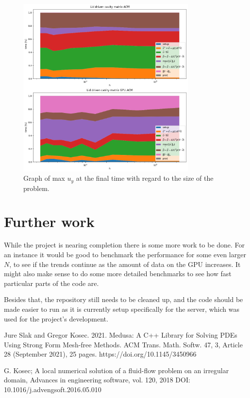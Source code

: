 \documentclass{article}
\begin{document}
\begin{figure}[h!] 
    \centering 
    \includegraphics[width=0.8\textwidth]{plots/lidDrivenACM_conv.png} 
    \caption{Graph of max $u_y$ at the final time with regard to the size of the problem.}
    \label{fig:lidDrivenACM_conv} 
\end{figure}
\section{Further work}
While the project is nearing completion there is some more work to be done. For an instance it 
would be good to benchmark the performance for some even larger \(N\), to see if the trends continue
as the amount of data on the GPU increases. It might also make sense to do some more detailed 
benchmarks to see how fast particular parts of the code are.

Besides that, the repository still needs to be cleaned up, and the code should be made easier to run
as it is currently setup specifically for the server, which was used for the project's development. 
\begin{thebibliography}{99}
     Jure Slak and Gregor Kosec. 2021. Medusa: A C++ Library
    for Solving PDEs Using Strong Form Mesh-free Methods. ACM Trans. Math. Softw. 47,
    3, Article 28 (September 2021), 25 pages. https://doi.org/10.1145/3450966

     G. Kosec; A local numerical solution of a fluid-flow problem
    on an irregular domain, Advances in engineering software, vol. 120, 2018
    DOI: 10.1016/j.advengsoft.2016.05.010
\end{thebibliography}
\end{document}
